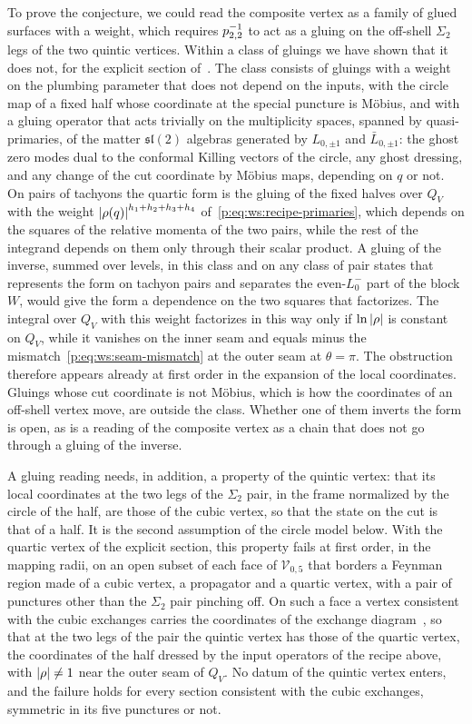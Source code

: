 To prove the conjecture, we could read the composite vertex as a family of glued surfaces with a weight, which requires $p_{2,2}^{-1}$ to act as a gluing on the off-shell $\Sigma_2$ legs of the two quintic vertices.
  Within a class of gluings we have shown that it does not, for the explicit section of~\cite{Erbin:2026:SL2CVerticesClosed}.
  The class consists of gluings with a weight on the plumbing parameter that does not depend on the inputs, with the circle map of a fixed half whose coordinate at the special puncture is Möbius, and with a gluing operator that acts trivially on the multiplicity spaces, spanned by quasi-primaries, of the matter $\mathfrak{sl}(2)$ algebras generated by $L_{0, \pm 1}$ and $\bar L_{0, \pm 1}$: the ghost zero modes dual to the conformal Killing vectors of the circle, any ghost dressing, and any change of the cut coordinate by Möbius maps, depending on $q$ or not.
  On pairs of tachyons the quartic form is the gluing of the fixed halves over $Q_V$ with the weight ${|\rho(q)|}^{h_1 + h_2 + h_3 + h_4}$ of~\eqref{p:eq:ws:recipe-primaries}, which depends on the squares of the relative momenta of the two pairs, while the rest of the integrand depends on them only through their scalar product.
  A gluing of the inverse, summed over levels, in this class and on any class of pair states that represents the form on tachyon pairs and separates the even-$L_0^-$ part of the block $W$, would give the form a dependence on the two squares that factorizes.
  The integral over $Q_V$ with this weight factorizes in this way only if $\ln {|\rho|}$ is constant on $Q_V$, while it vanishes on the inner seam and equals minus the mismatch~\eqref{p:eq:ws:seam-mismatch} at the outer seam at $\theta = \pi$.
  The obstruction therefore appears already at first order in the expansion of the local coordinates.
  Gluings whose cut coordinate is not Möbius, which is how the coordinates of an off-shell vertex move, are outside the class.
  Whether one of them inverts the form is open, as is a reading of the composite vertex as a chain that does not go through a gluing of the inverse.

  A gluing reading needs, in addition, a property of the quintic vertex: that its local coordinates at the two legs of the $\Sigma_2$ pair, in the frame normalized by the circle of the half, are those of the cubic vertex, so that the state on the cut is that of a half.
  It is the second assumption of the circle model below.
  With the quartic vertex of the explicit section, this property fails at first order, in the mapping radii, on an open subset of each face of $\mathcal V_{0,5}$ that borders a Feynman region made of a cubic vertex, a propagator and a quartic vertex, with a pair of punctures other than the $\Sigma_2$ pair pinching off.
  On such a face a vertex consistent with the cubic exchanges carries the coordinates of the exchange diagram~\cite{Zwiebach:1993:ClosedStringField}, so that at the two legs of the pair the quintic vertex has those of the quartic vertex, the coordinates of the half dressed by the input operators of the recipe above, with ${|\rho|} \neq 1$ near the outer seam of $Q_V$.
  No datum of the quintic vertex enters, and the failure holds for every section consistent with the cubic exchanges, symmetric in its five punctures or not.

